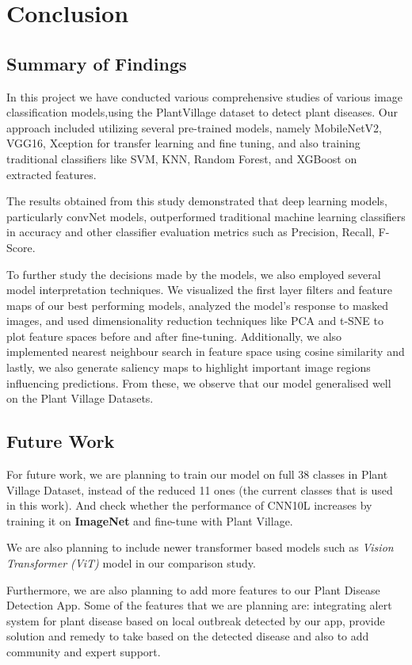 \chapter{Conclusion}

\section{Summary of Findings}
In this project we have conducted various comprehensive studies of various image classification models,using the PlantVillage dataset to detect plant diseases. Our approach included utilizing several pre-trained models, namely MobileNetV2, VGG16, Xception for transfer learning and fine tuning, and also training traditional classifiers like SVM, KNN, Random Forest, and XGBoost on extracted features.\par \vspace{1em}
The results obtained from this study demonstrated that deep learning models, particularly convNet models, outperformed traditional machine learning classifiers in accuracy and other classifier evaluation metrics such as Precision, Recall, F-Score. 
\par\vspace{1em}
To further study the decisions made by the models, we also employed several model interpretation techniques. We visualized the first layer filters and feature maps of our best performing models, analyzed the model's response to masked images, and used dimensionality reduction techniques like PCA and t-SNE to plot feature spaces before and after fine-tuning. Additionally, we also implemented nearest neighbour search in feature space using cosine similarity and lastly, we also generate saliency maps to highlight important image regions influencing predictions. From these, we observe that our model generalised well on the Plant Village Datasets.
\par\vspace{1em}

\section{Future Work}
For future work,  we are planning to train our model on full 38 classes in Plant Village Dataset, instead of the reduced 11 ones (the current classes that is used in this work).
And check whether the performance of CNN10L increases by training it on \textbf{ImageNet} and fine-tune with Plant Village.\par \vspace{1em}
We are also planning to include newer transformer based models\cite{attention-is-all-you-need} such as \textit{Vision Transformer (ViT)} model\cite{vision-transformer} in our comparison study.\par \vspace{1em}
Furthermore, we are also planning to add more features to our Plant Disease Detection App. Some of the features that we are planning are: integrating alert system for plant disease based on local outbreak detected by our app, provide solution and remedy to take based on the detected disease and also to add community and expert support.\par\vspace{1em}


\par

\newpage
